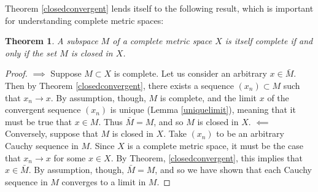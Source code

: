\documentclass[11pt]{article}
\theoremstyle{mystyle}
\newtheorem{thm}{Theorem}[section]
\begin{document}
Theorem \ref{closedconvergent} lends itself to the following result, which is important for understanding complete metric spaces:
\begin{thm}\label{closedcomplete}
A subspace $M$ of a complete metric space $X$ is itself complete if and only if the set $M$ is closed in $X$.
\end{thm}
\begin{proof}
$\implies$ Suppose $M \subset X$ is complete. Let us consider an arbitrary $x \in \bar{M}$. Then by Theorem \ref{closedconvergent}, there exists a sequence $(x_n) \subset M$ such that $x_n \longrightarrow x$. By assumption, though, $M$ is complete, and the limit $x$ of the convergent sequence $(x_n)$ is unique (Lemma \ref{uniquelimit}), meaning that it must be true that $x \in M$. Thus $\bar{M} = M$, and so $M$ is closed in $X$.\newline
$\impliedby$ Conversely, suppose that $M$ is closed in $X$. Take $(x_n)$ to be an arbitrary Cauchy sequence in $M$. Since $X$ is a complete metric space, it must be the case that $x_n \longrightarrow x$ for some $x \in X$. By Theorem, \ref{closedconvergent}, this implies that $x \in \bar{M}$. By assumption, though, $\bar{M} = M$, and so we have shown that each Cauchy sequence in $M$ converges to a limit in $M$.
\end{proof}
\end{document}
